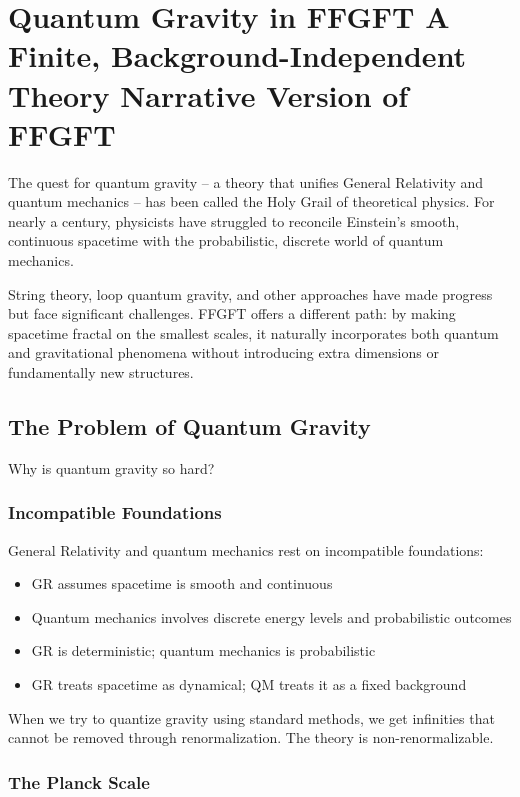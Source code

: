 \chapter{Quantum Gravity in FFGFT  A Finite, Background-Independent Theory  Narrative Version of FFGFT}


	
	The quest for quantum gravity -- a theory that unifies General Relativity and quantum mechanics -- has been called the Holy Grail of theoretical physics. For nearly a century, physicists have struggled to reconcile Einstein's smooth, continuous spacetime with the probabilistic, discrete world of quantum mechanics.
	
	String theory, loop quantum gravity, and other approaches have made progress but face significant challenges. FFGFT offers a different path: by making spacetime fractal on the smallest scales, it naturally incorporates both quantum and gravitational phenomena without introducing extra dimensions or fundamentally new structures.
	
	\section{The Problem of Quantum Gravity}
	
	Why is quantum gravity so hard?
	
	\subsection{Incompatible Foundations}
	
	General Relativity and quantum mechanics rest on incompatible foundations:
	\begin{itemize}[leftmargin=*]
		\item GR assumes spacetime is smooth and continuous
		\item Quantum mechanics involves discrete energy levels and probabilistic outcomes
		\item GR is deterministic; quantum mechanics is probabilistic
		\item GR treats spacetime as dynamical; QM treats it as a fixed background
	\end{itemize}
	
	When we try to quantize gravity using standard methods, we get infinities that cannot be removed through renormalization. The theory is non-renormalizable.
	
	\subsection{The Planck Scale}
	
